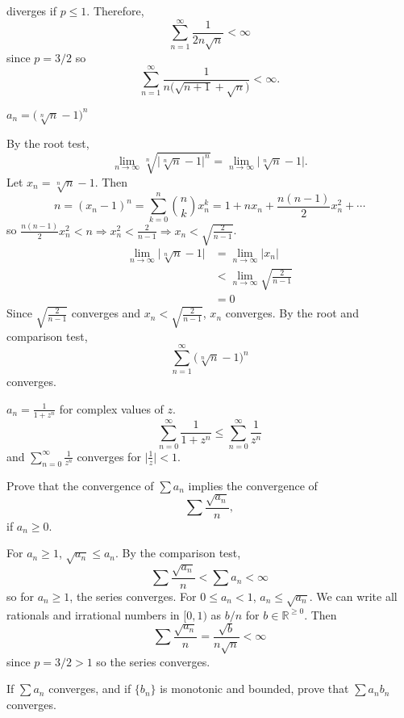 \begin{exercise}
\begin{exercise}[label = (\alph*)]
    diverges if \(p\leq 1\).
    Therefore,
    \[
    \sum_{n = 1}^{\infty}\frac{1}{2n\sqrt{n}} < \infty
    \]
    since \(p = 3/2\) so
    \[
    \sum_{n = 1}^{\infty}\frac{1}{n\bigl(\sqrt{n + 1} + \sqrt{n}\bigr)} <
    \infty.
    \]
  \item
    \(a_n = \bigl(\sqrt[n]{n} - 1\bigr)^n\)
    \par\smallskip
    By the root test,
    \[
    \lim_{n\to\infty}\sqrt[n]{\lvert\sqrt[n]{n} - 1\rvert^n} =
    \lim_{n\to\infty}\lvert\sqrt[n]{n} - 1\rvert.
    \]
    Let \(x_n = \sqrt[n]{n} - 1\).
    Then
    \[
    n = (x_n - 1)^n = \sum_{k = 0}^n\binom{n}{k}x_n^k = 1 + nx_n +
    \frac{n(n-1)}{2}x_n^2 + \cdots
    \]
    so \(\frac{n(n-1)}{2}x_n^2 < n\Rightarrow x_n^2 < \frac{2}{n - 1}
    \Rightarrow x_n < \sqrt{\frac{2}{n - 1}}\).
    \begin{align*}
      \lim_{n\to\infty}\lvert\sqrt[n]{n} - 1\rvert
      & = \lim_{n\to\infty}\lvert x_n\rvert\\
      & < \lim_{n\to\infty}\sqrt{\frac{2}{n - 1}}\\
      & = 0
    \end{align*}
    Since \(\sqrt{\frac{2}{n - 1}}\) converges and
    \(x_n < \sqrt{\frac{2}{n - 1}}\), \(x_n\) converges.
    By the root and comparison test,
    \[
    \sum_{n = 1}^{\infty}\bigl(\sqrt[n]{n} - 1\bigr)^n
    \]
    converges.
  \item
    \(a_n = \frac{1}{1 + z^n}\) for complex values of \(z\).
    \[
    \sum_{n = 0}^{\infty}\frac{1}{1 + z^n}\leq
    \sum_{n = 0}^{\infty}\frac{1}{z^n}
    \]
    and \(\sum_{n = 0}^{\infty}\frac{1}{z^n}\) converges for
    \(\bigl\lvert\frac{1}{z}\bigr\rvert < 1\).
  \end{exercise}
\item
  Prove that the convergence of \(\sum a_n\) implies the convergence of
  \[
  \sum\frac{\sqrt{a_n}}{n},
  \]
  if \(a_n\geq 0\).
  \par\smallskip
  For \(a_n\geq 1\), \(\sqrt{a_n}\leq a_n\).
  By the comparison test,
  \[
  \sum\frac{\sqrt{a_n}}{n} < \sum a_n < \infty
  \]
  so for \(a_n\geq 1\), the series converges.
  For \(0\leq a_n < 1\), \(a_n\leq\sqrt{a_n}\).
  We can write all rationals and irrational numbers in \([0,1)\) as \(b/n\)
  for \(b\in\mathbb{R}^{\geq 0}\).
  Then
  \[
  \sum\frac{\sqrt{a_n}}{n} = \frac{\sqrt{b}}{n\sqrt{n}} < \infty
  \]
  since \(p = 3/2 > 1\) so the series converges.
\item
  If \(\sum a_n\) converges, and if \(\{b_n\}\) is monotonic and bounded,
  prove that \(\sum a_nb_n\) converges.

\end{exercise}
